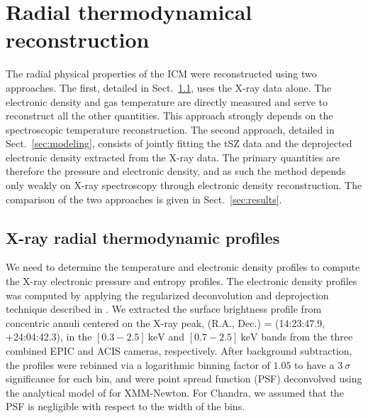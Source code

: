 \documentclass[traditabstract]{aa}
\begin{document}
\section{Radial thermodynamical reconstruction}\label{sec:Radial_pressure_reconstruction}
The radial physical properties of the ICM were reconstructed using two approaches. The first, detailed in Sect.~\ref{sec:X_ray_extraction_of_the_cluster_radial_thermodynamic_profiles},  uses the X-ray data alone. The electronic density and  gas temperature are directly measured and serve to reconstruct all the other quantities. This approach strongly depends on the spectroscopic temperature reconstruction. The second approach, detailed in Sect.~\ref{sec:modeling}, consists of  jointly fitting the tSZ data and the deprojected electronic density extracted from the X-ray data. The primary quantities are therefore the pressure and electronic density, and as such the method depends only weakly on X-ray spectroscopy through  electronic density reconstruction. The comparison of the two approaches is given in Sect.~\ref{sec:results}.

\subsection{X-ray radial thermodynamic profiles}\label{sec:X_ray_extraction_of_the_cluster_radial_thermodynamic_profiles}
We need to determine the temperature and electronic density profiles to compute the X-ray electronic pressure and entropy profiles. The electronic density profiles was computed by applying the regularized deconvolution and deprojection technique described in \cite{croston2006}. We extracted the surface brightness profile from concentric annuli centered on the X-ray peak, (R.A., Dec.) = (14:23:47.9, +24:04:42.3), in the $[0.3-2.5] \ \si{\kilo\electronvolt}$ and $[0.7-2.5] \ \si{\kilo\electronvolt}$ bands from the three combined EPIC and ACIS cameras, respectively. After background subtraction, the profiles were rebinned via a logarithmic binning factor of $1.05$ to have a $3 \ \sigma$ significance for each bin, and were point spread function (PSF) deconvolved using the analytical model of \cite{ghizzardi2001} for XMM-Newton. For Chandra, we assumed that the PSF is negligible with respect to the width of the bins. 
\end{document}
